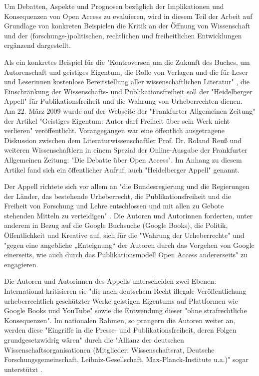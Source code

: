 Um Debatten, Aspekte und Prognosen bezüglich der Implikationen und Konsequenzen von Open Access zu evaluieren, wird in diesem Teil der Arbeit auf Grundlage von konkreten Beispielen die Kritik an der Öffnung von Wissenschaft und der (forschungs-)politischen, rechtlichen und freiheitlichen Entwicklungen ergänzend dargestellt.

Als ein konkretes Beispiel für die "Kontroversen um die Zukunft des Buches, um Autorenschaft und geistiges Eigentum, die Rolle von Verlagen und die für Leser und Leserinnen kostenlose Bereitstellung aller wissenschaftlichen Literatur" \cite{hagner_2015_sache_buches}, die Einschränkung der Wissenschafts- und Publikationsfreiheit soll der "Heidelberger Appell" für Publikationsfreiheit und die Wahrung von Urheberrechten dienen. Am 22. März 2009 wurde auf der Webseite der "Frankfurter Allgemeinen Zeitung" der Artikel "Geistiges Eigentum: Autor darf Freiheit über sein Werk nicht verlieren" \cite{faz_heidelberger_apell_2009} veröffentlicht. Vorangegangen war eine öffentlich ausgetragene Diskussion zwischen dem Literaturwissenschaftler Prof. Dr. Roland Reuß und weiteren Wissenschaftlern in einem Spezial der Online-Ausgabe der Frankfurter Allgemeinen Zeitung: "Die Debatte über Open Access". Im Anhang zu diesem Artikel fand sich ein öffentlicher Aufruf, auch "Heidelberger Appell" genannt.

Der Appell richtete sich vor allem an "die Bundesregierung und die Regierungen der Länder, das bestehende Urheberrecht, die Publikationsfreiheit und die Freiheit von Forschung und Lehre entschlossen und mit allen zu Gebote stehenden Mitteln zu verteidigen" \cite{ITK_2009}. Die Autoren und Autorinnen forderten, unter anderem in Bezug auf die Google Buchsuche (Google Books), die Politik, Öffentlichkeit und Kreative auf, sich für die "Wahrung der Urheberrechte" und "gegen eine angebliche „Enteignung“ der Autoren durch das Vorgehen von Google einerseits, wie auch durch das Publikationsmodell Open Access andererseits" \cite{WD_bundestag_2009} zu engagieren.

Die Autoren und Autorinnen des Appells unterscheiden zwei Ebenen: International kritisieren sie "die nach deutschem Recht illegale Veröffentlichung urheberrechtlich geschützter Werke geistigen Eigentums auf Plattformen wie Google Books und YouTube" sowie die Entwendung dieser "ohne strafrechtliche Konsequenzen". Im nationalen Rahmen, so prangern die Autoren weiter an, werden diese "Eingriffe in die Presse- und Publikationsfreiheit, deren Folgen grundgesetzwidrig wären" durch die "Allianz der deutschen Wissenschaftsorganisationen (Mitglieder: Wissenschaftsrat, Deutsche Forschungsgemeinschaft, Leibniz-Gesellschaft, Max-Planck-Institute u.a.)" sogar unterstützt \cite{ITK_2009}.


